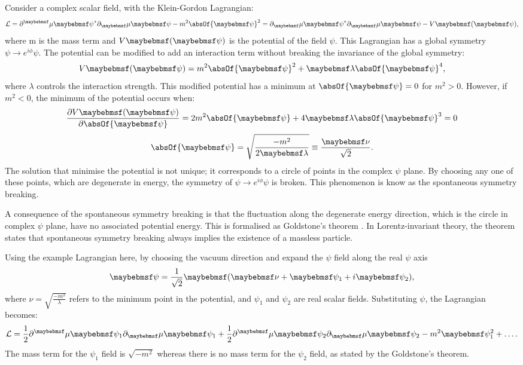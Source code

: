 Consider a complex scalar field, with the Klein-Gordon Lagrangian:
\begin{equation}
\Lagr = \partial^\mu{\psi}^*\partial_\mu\psi - m^2 \absOf{\psi}^2 =  \partial_\mu{\psi}^*\partial_\mu\psi - V\parenths{\psi} ,
\end{equation}
where m is the mass term and $V\parenths{\psi} $ is the potential of the field $\psi$. This Lagrangian has a global symmetry $\psi \to e^{i\phi}\psi$. The potential can be modified to add an interaction term without breaking the  invariance of the global symmetry:
\begin{equation}
V\parenths{\psi} =  m^2 \absOf{\psi}^2 + \lambda\absOf{\psi}^4,
\end{equation}
where $\lambda$ controls the interaction strength. This modified potential has a minimum at $ \absOf{\psi}=0$ for $m^2>0$. However, if $m^2<0$, the minimum of the potential occurs when:
\begin{equation}
\frac{\partial{V}\parenths{\psi}}{\partial{\absOf{\psi}}} =  2 m^2 \absOf{\psi} + 4\lambda\absOf{\psi}^3 = 0
\end{equation}
\begin{equation}
\absOf{\psi} = \sqrt{\frac{-m^2}{2\lambda}}\equiv \frac{\nu}{\sqrt{2}}.
\end{equation}
The solution that minimise the potential is not unique; it corresponds to a circle of points in the complex $\psi$ plane. By choosing any one of these points, which are degenerate in energy, the symmetry of   $\psi \to e^{i\phi}\psi$ is broken. This phenomenon is know as the spontaneous symmetry breaking.

A consequence of the  spontaneous symmetry breaking is that the fluctuation along the degenerate energy direction, which is the circle in complex $\psi$ plane, have no associated potential energy. This is formalised as Goldstone's theorem \cite{Nambu:1960tm,Goldstone:1961eq}. In Lorentz-invariant theory, the theorem states that spontaneous symmetry breaking always implies the existence of a massless particle.

Using the example Lagrangian here, by choosing the vacuum direction and expand the $\psi$ field along the real $\psi$ axis
\begin{equation}
\psi = \frac{1}{\sqrt{2}}\parenths{\nu+\psi_1+i\psi_2},
\end{equation}
where $\nu=\sqrt{\frac{-m^2}{\lambda}}$ refers to the minimum point in the potential, and $\psi_1$ and $\psi_2$ are real scalar fields. Substituting $\psi$, the Lagrangian becomes:
\begin{equation}
\Lagr = \frac{1}{2}\partial^\mu{\psi_1}\partial_\mu\psi_1 + \frac{1}{2}\partial^\mu{\psi_2}\partial_\mu\psi_2 - m^2 \psi_1^2 + \hdots.
\end{equation}
The mass term for the $\psi_1$ field is $\sqrt{-m^2}$ whereas there is no mass term for the $\psi_2$ field, as stated by the Goldstone's theorem.

